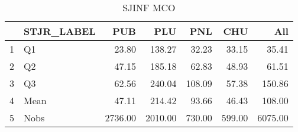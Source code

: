 \begin{table}[ht]
\centering
\begin{tabular}{rlrrrrr}
  \hline
 & STJR\_LABEL & PUB & PLU & PNL & CHU & All \\ 
  \hline
1 & Q1 & 23.80 & 138.27 & 32.23 & 33.15 & 35.41 \\ 
  2 & Q2 & 47.15 & 185.18 & 62.83 & 48.93 & 61.51 \\ 
  3 & Q3 & 62.56 & 240.04 & 108.09 & 57.38 & 150.86 \\ 
  4 & Mean & 47.11 & 214.42 & 93.66 & 46.43 & 108.00 \\ 
  5 & Nobs & 2736.00 & 2010.00 & 730.00 & 599.00 & 6075.00 \\ 
   \hline
\end{tabular}
\caption{SJINF MCO} 
\end{table}

